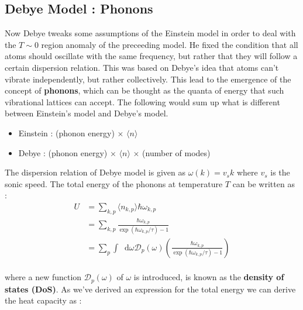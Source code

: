 \documentclass[paper=a4, fontsize=11pt]{scrartcl}
\newcommand*\dif{\mathop{}\!\mathrm{d}}
\newcommand{\expval}[1]{\langle #1 \rangle}
\begin{document}
\vspace{0.15in}
\subsection{Debye Model : Phonons}
\vspace{0.15in}

Now Debye tweaks some assumptions of the Einstein model in order to deal with the $T\sim 0$ region anomaly of the preceeding model. He fixed the condition that all atoms should oscillate with the same frequency, but rather that they will follow a certain dispersion relation. This was based on Debye's idea that atoms can't vibrate independently, but rather collectively. This lead to the emergence of the concept of \textbf{phonons}, which can be thought as the quanta of energy that such vibrational lattices can accept. The following would sum up what is different between Einstein's model and Debye's model. \\

\begin{itemize}
	\item Einstein : (phonon energy) $\times$ $\expval{n}$
	\item Debye : (phonon energy) $\times$ $\expval{n}$ $\times$ (number of modes)\\
\end{itemize}

The dispersion relation of Debye model is given as $\omega(k) = v_s k$ where $v_s$ is the sonic speed. The total energy of the phonons at temperature $T$ can be written as : \\

\begin{equation}\nonumber
\begin{split}
	U &= \sum_{k,p} \expval{n_{k,p}} \hbar \omega_{k,p} \\[2.5ex]
	&= \sum_{k,p} \frac{\hbar \omega_{k,p} }{\exp(\hbar \omega_{k,p}  / \tau) - 1}  \\[2.5ex]
	&= \sum_{p} \int \dif \omega \mathcal{D}_p(\omega) \left( \frac{\hbar \omega_{k,p} }{\exp(\hbar \omega_{k,p}  / \tau) - 1}  \right)
\end{split}
\end{equation}\\

where a new function $\mathcal{D}_p(\omega)$ of $\omega$ is introduced, is known as the \textbf{density of states (DoS)}. As we've derived an expression for the total energy we can derive the heat capacity as : \\
\end{document}
